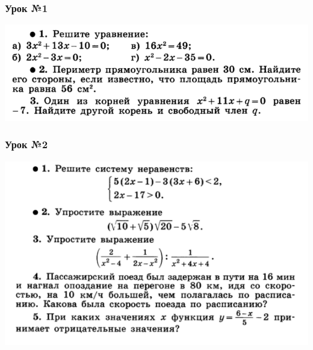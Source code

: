 \documentclass[algebra,a5paper]{pum}
\date{14.05.20}
\begin{document}
\subsubsection*{Урок №1}
\includegraphics[width=\textwidth]{img/25-1.png}

\subsubsection*{Урок №2}
\includegraphics[width=\textwidth]{img/25-2.png}
\end{document}

